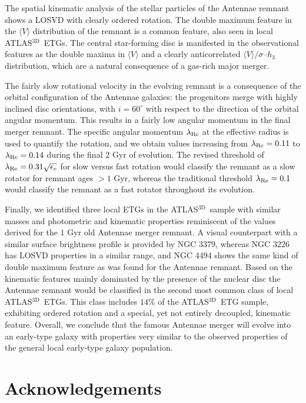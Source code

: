 \documentclass[a4paper,fleqn,usenatbib]{mnras}
\newcommand{\atlas}{\textsc{ATLAS$^\mathrm{3D}$}}
\begin{document}
The spatial kinematic analysis of the stellar particles of the Antennae remnant shows a LOSVD with clearly ordered rotation. 
The double maximum feature in the $\langle V \rangle$ distribution
of the remnant is a common feature, also seen in local \atlas\ ETGs. 
The central star-forming disc is manifested in the observational 
features as the double maxima in $\langle V \rangle$ and a clearly anticorrelated $\langle V \rangle/\sigma$--$h_3$ distribution, which are a
natural consequence of a gas-rich major merger.

The fairly slow rotational velocity in the evolving remnant is a consequence of the orbital configuration of the Antennae galaxies: the
progenitors merge with highly inclined disc orientations, with $i=60^{\circ}$ with respect to the direction of the orbital angular momentum. 
This results in a fairly low angular momentum in the final merger remnant.
The specific angular momentum $\lambda_{\rm{Re}}$ at the effective radius is used to quantify the rotation, and we obtain values
increasing from $\lambda_{\rm{Re}}=0.11$ to $\lambda_{\rm{Re}}=0.14$ during the final $2$ Gyr of evolution. 
The revised threshold of $\lambda_{\rm{Re}}=0.31\sqrt{\epsilon_{\rm{e}}}$ for slow versus fast rotation
would classify the remnant as a slow rotator for remnant ages $> 1$ Gyr, whereas
the traditional threshold $\lambda_{\rm{Re}}=0.1$ would classify the remnant as a fast rotator throughout its evolution.

Finally, we identified three local ETGs in the \atlas\ sample with similar masses and photometric and kinematic properties reminiscent of the values
derived for the $1$ Gyr old Antennae merger remnant. A visual counterpart with a similar surface brightness profile is provided by NGC 3379, whereas
NGC 3226 has LOSVD properties in a similar range, and NGC 4494 shows the same kind of double maximum feature
as was found for the Antennae remnant. 
Based on the kinematic features mainly dominated by the presence of the nuclear disc the Antennae remnant would be classified 
in the second most common class of local  \atlas\ ETGs. This class includes 
$14\%$ of the \atlas\ ETG sample, exhibiting ordered rotation and a special, yet not entirely decoupled, kinematic feature. 
Overall, we conclude that the famous Antennae merger will evolve into an early-type galaxy with properties very similar to the observed 
properties of the general local early-type galaxy population. 



\section*{Acknowledgements}
\end{document}
